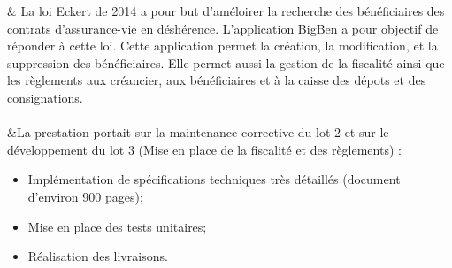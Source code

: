 
& La loi Eckert de 2014 a pour but d'améloirer la recherche des bénéficiaires des contrats d’assurance-vie en déshérence.
L'application BigBen a pour objectif de réponder à cette loi. Cette application permet la création, la modification, et la suppression des bénéficiaires. 
Elle permet aussi la gestion de la fiscalité ainsi que les règlements aux créancier, aux bénéficiaires et à la caisse des dépots et des consignations. \\\\
&La prestation portait sur la maintenance corrective du lot 2 et sur le développement du lot 3 (Mise en place de la fiscalité et des règlements) :
\begin{itemize}%
	\item Implémentation de spécifications techniques très détaillés (document d'environ 900 pages);%
	\item Mise en place des tests unitaires;%
	\item Réalisation des livraisons.%
\end{itemize}%

